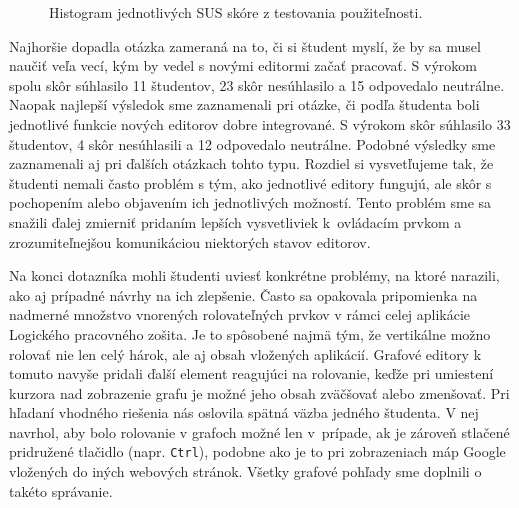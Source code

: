 \begin{figure}
    \centering
    \caption{Histogram jednotlivých SUS skóre z testovania použiteľnosti.}
    \label{fig:histogram-skore}
\end{figure}

Najhoršie dopadla otázka zameraná na to, či si študent myslí, že by sa musel naučiť veľa vecí, kým by vedel s novými editormi začať pracovať. S výrokom spolu skôr súhlasilo 11 študentov, 23 skôr nesúhlasilo a 15 odpovedalo neutrálne. Naopak najlepší výsledok sme zaznamenali pri otázke, či podľa študenta boli jednotlivé funkcie nových editorov dobre integrované. S výrokom skôr súhlasilo 33 študentov, 4 skôr nesúhlasili a 12 odpovedalo neutrálne. Podobné výsledky sme zaznamenali aj pri ďalších otázkach tohto typu. Rozdiel si vysvetľujeme tak, že študenti nemali často problém s tým, ako jednotlivé editory fungujú, ale skôr s pochopením alebo objavením ich jednotlivých možností. Tento problém sme sa snažili ďalej zmierniť pridaním lepších vysvetliviek k~ovládacím prvkom a zrozumiteľnejšou komunikáciou niektorých stavov editorov.

Na konci dotazníka mohli študenti uviesť konkrétne problémy, na ktoré narazili, ako aj prípadné návrhy na ich zlepšenie. Často sa opakovala pripomienka na nadmerné množstvo vnorených rolovateľných prvkov v rámci celej aplikácie Logického pracovného zošita. Je to spôsobené najmä tým, že vertikálne možno rolovať nie len celý hárok, ale aj obsah vložených aplikácií. Grafové editory k tomuto navyše pridali ďalší element reagujúci na rolovanie, keďže pri umiestení kurzora nad zobrazenie grafu je možné jeho obsah zväčšovať alebo zmenšovať. Pri hľadaní vhodného riešenia nás oslovila spätná väzba jedného študenta. V nej navrhol, aby bolo rolovanie v grafoch možné len v~prípade, ak je zároveň stlačené pridružené tlačidlo (napr. \texttt{Ctrl}), podobne ako je to pri zobrazeniach máp Google vložených do iných webových stránok. Všetky grafové pohľady sme doplnili o takéto správanie.

